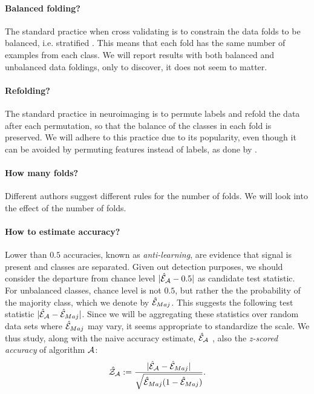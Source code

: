 \documentclass[12pt,a4paper]{article}
\begin{document}
\paragraph{Balanced folding?}
The standard practice when cross validating is to constrain the data folds to be balanced, i.e. stratified \citep[e.g.][]{ojala_permutation_2010}.
This means that each fold has the same number of examples from each class. 
We will report results with both balanced and unbalanced data foldings, only to discover, it does not seem to matter. 


\paragraph{Refolding?}
The standard practice in neuroimaging is to permute labels and refold the data after each permutation, so that the balance of the classes in each fold is preserved.
We will adhere to this practice due to its popularity, even though it can be avoided by permuting features instead of labels, as done by \citet{golland_permutation_2005}.


\paragraph{How many folds?}
Different authors suggest different rules for the number of folds. 
We will look into the effect of the number of folds. 

\paragraph{How to estimate accuracy?}
\label{sec:estimate_accuracy}
Lower than $0.5$ accuracies, known as \emph{anti-learning}, are evidence that signal is present and classes are separated. Given out detection purposes, we should consider the departure from chance level $|\hat{\mathcal{E}}_{\mathcal{A}}-0.5|$ as candidate test statistic.
For unbalanced classes, chance level is not $0.5$, but rather the the probability of the majority class, which we denote by $\hat{\mathcal{E}}_{Maj}$.
This suggests the following test statistic $|\hat{\mathcal{E}}_{\mathcal{A}}-\hat{\mathcal{E}}_{Maj}|$.
Since we will be aggregating these statistics over random data sets where $\hat{\mathcal{E}}_{Maj}$ may vary, it seems appropriate to standardize the scale. 
We thus study, along with the naive accuracy estimate, $\hat{\mathcal{E}}_{\mathcal{A}}$ , also the \emph{z-scored accuracy} of algorithm $\mathcal{A}$:
\begin{align}
\label{eq:z_scored_accuracy}
	\hat{\mathcal{Z}}_{\mathcal{A}} := \frac{|\hat{\mathcal{E}}_{\mathcal{A}}-\hat{\mathcal{E}}_{Maj}|}{\sqrt{\hat{\mathcal{E}}_{Maj}(1-\hat{\mathcal{E}}_{Maj})}}.
\end{align} 
\end{document}
